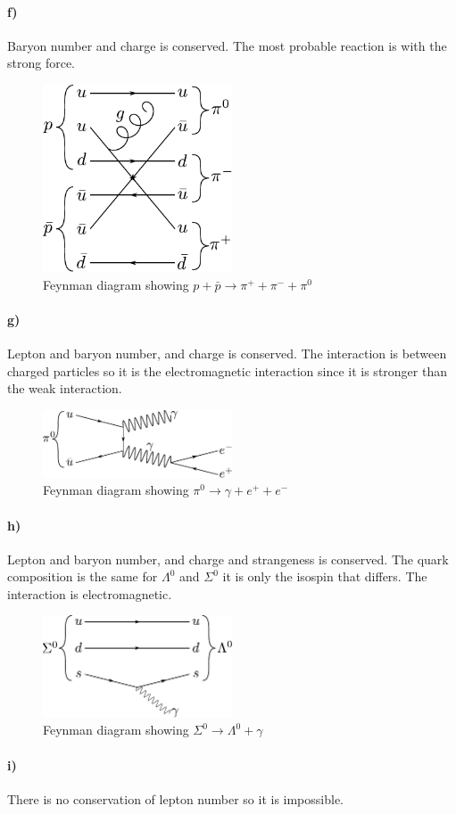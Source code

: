 \paragraph{f)} Baryon number and charge is conserved. The most probable reaction is with the strong force.

\begin{figure}[H]
	\centering
	\includegraphics[width=0.5\textwidth]{figures/classify_f.pdf}
	\caption{Feynman diagram showing $p + \bar{p} \to \pi^+ + \pi^- + \pi^0 $}
\end{figure}

\paragraph{g)} Lepton and baryon number, and charge is conserved. The interaction is between charged particles so it is the electromagnetic interaction since it is stronger than the weak interaction.

\begin{figure}[H]
	\centering
	\includegraphics[width=0.5\textwidth]{figures/classify_g.pdf}
	\caption{Feynman diagram showing $\pi^0 \to \gamma + e^+ + e^- $}
\end{figure}

\paragraph{h)} Lepton and baryon number, and charge and strangeness is conserved. The quark composition is the same for $\Lambda^0$ and $\Sigma^0$ it is only the isospin that differs. The interaction is electromagnetic.

\begin{figure}[H]
	\centering
	\includegraphics[width=0.5\textwidth]{figures/classify_h.pdf}
	\caption{Feynman diagram showing $\Sigma^0 \to \Lambda^0 + \gamma $}
\end{figure}

\paragraph{i)} There is no conservation of lepton number so it is impossible.